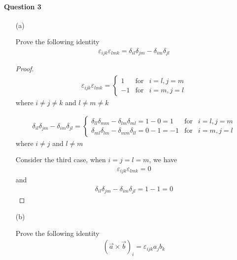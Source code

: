 \documentclass[11pt,a4paper]{article}
\begin{document}
\newpage

\paragraph{Question 3}

\begin{enumerate}

\item[(a)]

Prove the following identity
\begin{align}
\varepsilon_{ijk}\varepsilon_{lmk}=\delta_{il}\delta_{jm}-\delta_{im}\delta_{jl}
\end{align}

\begin{proof}

\begin{align}
\varepsilon_{ijk}\varepsilon_{lmk}=
\left\{
\begin{array}{lcl}
1 & \mbox{for} & i=l,j=m \\
-1 & \mbox{for} & i=m,j=l
\end{array}
\right.
\end{align}
where $i\neq j\neq k$ and $l\neq m\neq k$

\begin{align}
\delta_{il}\delta_{jm}-\delta_{im}\delta_{jl}=
\left\{
\begin{array}{lcl}
\delta_{ll}\delta_{mm}-\delta_{lm}\delta_{ml}=1-0=1 & \mbox{for} & i=l,j=m \\
\delta_{ml}\delta_{lm}-\delta_{mm}\delta_{ll}=0-1=-1 & \mbox{for} & i=m,j=l
\end{array}
\right.
\end{align}
where $i\neq j$ and $l\neq m$

Consider the third case, when $i=j=l=m$, we have
\begin{align}
\varepsilon_{ijk}\varepsilon_{lmk}=0
\end{align}
and
\begin{align}
\delta_{il}\delta_{jm}-\delta_{im}\delta_{jl}=1-1=0
\end{align}

\end{proof}

\item[(b)]

Prove the following identity
\begin{align}
(\vec{a}\times\vec{b})_i=\varepsilon_{ijk}a_jb_k
\end{align}


\end{enumerate}
\end{document}
